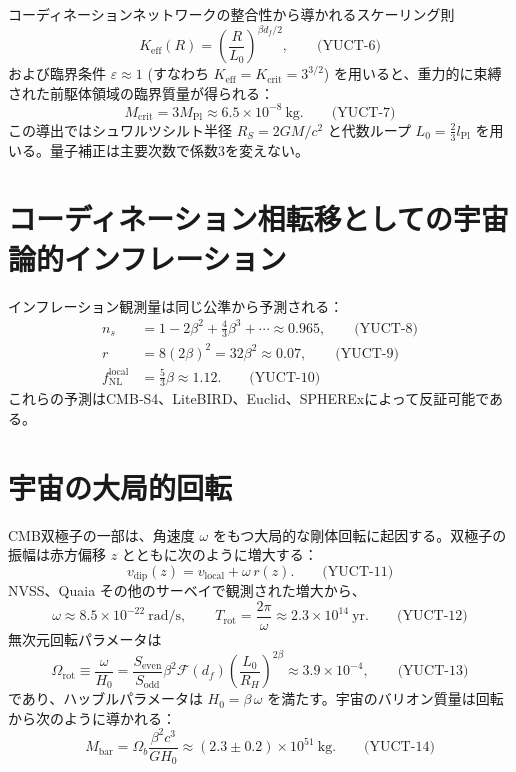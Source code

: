 \documentclass[12pt,a4paper]{article}
\newcommand{\Keff}{K_{\mathrm{eff}}}
\newcommand{\betaf}{\beta}
\newcommand{\Lpl}{l_{\mathrm{Pl}}}
\newcommand{\Sodd}{S_{\mathrm{odd}}}
\newcommand{\Seven}{S_{\mathrm{even}}}
\newcommand{\Lzero}{L_0}
\newcommand{\Mbar}{M_{\mathrm{bar}}}
\begin{document}
	コーディネーションネットワークの整合性から導かれるスケーリング則
	\[
	\Keff(R) = \left(\frac{R}{\Lzero}\right)^{\betaf d_f/2}, \qquad\text{(YUCT-6)}
	\]
	および臨界条件 \(\varepsilon \approx 1\) (すなわち \(\Keff = K_{\mathrm{crit}} = 3^{3/2}\)) を用いると、重力的に束縛された前駆体領域の臨界質量が得られる：
	\[
	M_{\mathrm{crit}} = 3 M_{\mathrm{Pl}} \approx 6.5\times 10^{-8}\ \mathrm{kg}. \qquad\text{(YUCT-7)}
	\]
	この導出ではシュワルツシルト半径 \(R_S = 2GM/c^2\) と代数ループ \(\Lzero = \frac{2}{3}\Lpl\) を用いる。量子補正は主要次数で係数3を変えない。
	
	\section{コーディネーション相転移としての宇宙論的インフレーション}
	
	インフレーション観測量は同じ公準から予測される：
	\begin{align}
		n_s &= 1 - 2\betaf^2 + \frac{4}{3}\betaf^3 + \cdots \approx 0.965, \qquad\text{(YUCT-8)}\\
		r &= 8(2\betaf)^2 = 32\betaf^2 \approx 0.07, \qquad\text{(YUCT-9)}\\
		f_{\mathrm{NL}}^{\mathrm{local}} &= \frac{5}{3}\betaf \approx 1.12. \qquad\text{(YUCT-10)}
	\end{align}
	これらの予測はCMB‑S4、LiteBIRD、Euclid、SPHERExによって反証可能である。
	
	\section{宇宙の大局的回転}
	
	CMB双極子の一部は、角速度 \(\omega\) をもつ大局的な剛体回転に起因する。双極子の振幅は赤方偏移 \(z\) とともに次のように増大する：
	\[
	v_{\mathrm{dip}}(z) = v_{\mathrm{local}} + \omega\, r(z). \qquad\text{(YUCT-11)}
	\]
	NVSS、Quaia その他のサーベイで観測された増大から、
	\[
	\omega \approx 8.5\times 10^{-22}\ \mathrm{rad/s},\qquad
	T_{\mathrm{rot}} = \frac{2\pi}{\omega} \approx 2.3\times 10^{14}\ \mathrm{yr}. \qquad\text{(YUCT-12)}
	\]
	無次元回転パラメータは
	\[
	\Omega_{\mathrm{rot}} \equiv \frac{\omega}{H_0} = \frac{\Seven}{\Sodd} \betaf^2 \mathcal{F}(d_f)\left(\frac{L_0}{R_H}\right)^{2\betaf} \approx 3.9\times 10^{-4}, \qquad\text{(YUCT-13)}
	\]
	であり、ハッブルパラメータは \(H_0 = \betaf\,\omega\) を満たす。宇宙のバリオン質量は回転から次のように導かれる：
	\[
	\Mbar = \Omega_b\frac{\betaf^2 c^3}{G H_0} \approx (2.3\pm 0.2)\times 10^{51}\ \mathrm{kg}. \qquad\text{(YUCT-14)}
	\]
	
\end{document}
